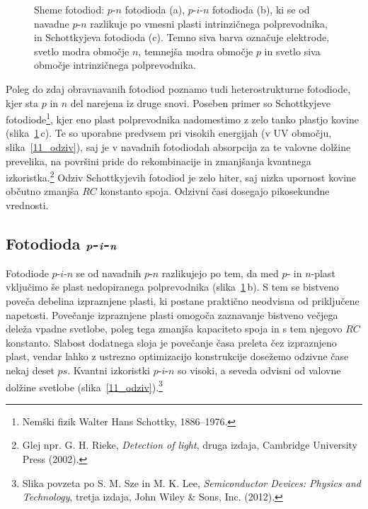 \begin{figure}[h]
\centering
\def\svgwidth{140truemm} 

\caption{Sheme fotodiod: $p$-$n$ fotodioda (a), $p$-$i$-$n$ fotodioda (b),  ki se od 
navadne $p$-$n$ razlikuje po vmesni plasti intrinzičnega
polprevodnika, in Schottkyjeva fotodioda (c). 
Temno siva barva označuje elektrode, svetlo modra območje $n$, 
temnejša modra območje $p$ in svetlo siva območje intrinzičnega polprevodnika. }
\label{11_shema}
\end{figure}
\begin{remark}
Poleg do zdaj obravnavanih fotodiod poznamo tudi heterostrukturne 
fotodiode, kjer sta $p$ in $n$ del
narejena iz druge snovi. Poseben primer so Schottkyjeve fotodiode\footnote{Nemški fizik
Walter Hans Schottky, 1886--1976.}, kjer eno plast polprevodnika
nadomestimo z zelo tanko plastjo kovine (slika~\ref{11_shema}\,c). Te so uporabne predvsem pri 
visokih energijah (v UV območju, slika~\ref{11_odziv}), 
saj je v navadnih fotodiodah absorpcija za te valovne dolžine prevelika, na površini pride do 
rekombinacije in zmanjšanja kvantnega izkoristka.\footnote{Glej npr. G. H. Rieke, {\it Detection 
of light}, druga izdaja, Cambridge University Press (2002).}  
Odziv Schottkyjevih fotodiod je zelo hiter, 
saj nizka upornost kovine občutno zmanjša $RC$ konstanto spoja. Odzivni časi 
dosegajo pikosekundne vrednosti.
\end{remark}

\subsection*{Fotodioda $\textbf{\textit{p}}$-$\textbf{\textit{i}}$-$\textbf{\textit{n}}$}
Fotodiode $p$-$i$-$n$ se od navadnih $p$-$n$ razlikujejo po tem, da med $p$- in $n$-plast 
vključimo še plast nedopiranega polprevodnika (slika~\ref{11_shema}\,b). 
S tem se bistveno poveča debelina
izpraznjene plasti, ki postane praktično neodvisna od priključene napetosti.
Povečanje izpraznjene plasti omogoča zaznavanje bistveno večjega deleža vpadne svetlobe, 
poleg tega zmanjša kapaciteto spoja in s tem njegovo $RC$ konstanto. Slabost dodatnega
sloja je povečanje časa preleta čez izpraznjeno plast, vendar lahko
z ustrezno optimizacijo konstrukcije dosežemo odzivne čase nekaj deset $\si{ps}$.
Kvantni izkoristki $p$-$i$-$n$ so visoki, a seveda odvisni od valovne dolžine svetlobe
(slika~\ref{11_odziv}).\footnote{Slika povzeta po S. M. Sze in M. K. Lee, {\it Semiconductor Devices: Physics
and Technology}, 
tretja izdaja, John Wiley \& Sons, Inc. (2012).}

